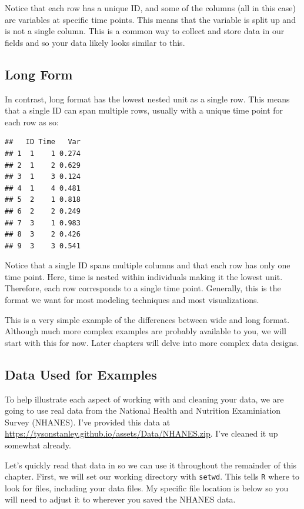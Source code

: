 \documentclass[]{tufte-book}
\theoremstyle{definition}
\theoremstyle{definition}
\theoremstyle{remark}
\begin{document}
Notice that each row has a unique ID, and some of the columns (all in
this case) are variables at specific time points. This means that the
variable is split up and is not a single column. This is a common way to
collect and store data in our fields and so your data likely looks
similar to this.

\subsection*{Long Form}\label{long-form}

In contrast, long format has the lowest nested unit as a single row.
This means that a single ID can span multiple rows, usually with a
unique time point for each row as so:

\begin{verbatim}
##   ID Time   Var
## 1  1    1 0.274
## 2  1    2 0.629
## 3  1    3 0.124
## 4  1    4 0.481
## 5  2    1 0.818
## 6  2    2 0.249
## 7  3    1 0.983
## 8  3    2 0.426
## 9  3    3 0.541
\end{verbatim}

Notice that a single ID spans multiple columns and that each row has
only one time point. Here, time is nested within individuals making it
the lowest unit. Therefore, each row corresponds to a single time point.
Generally, this is the format we want for most modeling techniques and
most visualizations.

This is a very simple example of the differences between wide and long
format. Although much more complex examples are probably available to
you, we will start with this for now. Later chapters will delve into
more complex data designs.

\subsection*{Data Used for Examples}\label{data-used-for-examples}

To help illustrate each aspect of working with and cleaning your data,
we are going to use real data from the National Health and Nutrition
Examiniation Survey (NHANES). I've provided this data at
\url{https://tysonstanley.github.io/assets/Data/NHANES.zip}. I've
cleaned it up somewhat already.

Let's quickly read that data in so we can use it throughout the
remainder of this chapter. First, we will set our working directory with
\texttt{setwd}. This tells \texttt{R} where to look for files, including
your data files. My specific file location is below so you will need to
adjust it to wherever you saved the NHANES data.
\end{document}
